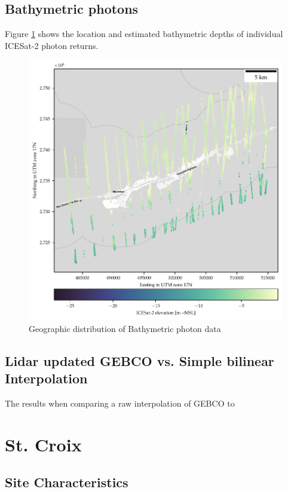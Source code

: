 \subsection{Bathymetric photons}
Figure \ref{fig:bathyphotonmap} shows the location and estimated bathymetric depths of individual ICESat-2 photon returns.
\begin{figure}[h]
    \centering
    \includegraphics[width=\textwidth]{figures/Florida_keys_photon_map.pdf}
    \caption{Geographic distribution of Bathymetric photon data}
    \label{fig:bathyphotonmap}
\end{figure}

\subsection{Lidar updated GEBCO vs. Simple bilinear Interpolation}
The results when comparing a raw interpolation of GEBCO to
% 



\section{St. Croix}

\subsection{Site Characteristics}

